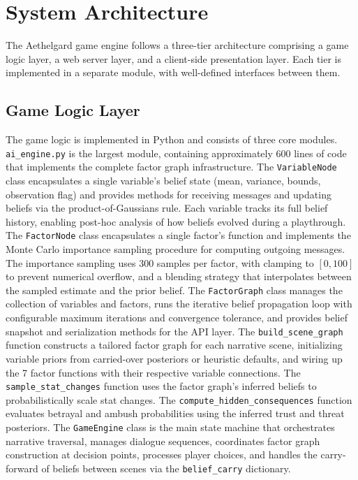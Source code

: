 \documentclass[journal]{IEEEtran}
\begin{document}
\section{System Architecture}

The Aethelgard game engine follows a three-tier architecture comprising a game logic layer, a web server layer, and a client-side presentation layer. Each tier is implemented in a separate module, with well-defined interfaces between them.

\subsection{Game Logic Layer}

The game logic is implemented in Python and consists of three core modules. \texttt{ai\_engine.py} is the largest module, containing approximately 600 lines of code that implements the complete factor graph infrastructure. The \texttt{VariableNode} class encapsulates a single variable's belief state (mean, variance, bounds, observation flag) and provides methods for receiving messages and updating beliefs via the product-of-Gaussians rule. Each variable tracks its full belief history, enabling post-hoc analysis of how beliefs evolved during a playthrough. The \texttt{FactorNode} class encapsulates a single factor's function and implements the Monte Carlo importance sampling procedure for computing outgoing messages. The importance sampling uses 300 samples per factor, with clamping to $[0, 100]$ to prevent numerical overflow, and a blending strategy that interpolates between the sampled estimate and the prior belief. The \texttt{FactorGraph} class manages the collection of variables and factors, runs the iterative belief propagation loop with configurable maximum iterations and convergence tolerance, and provides belief snapshot and serialization methods for the API layer. The \texttt{build\_scene\_graph} function constructs a tailored factor graph for each narrative scene, initializing variable priors from carried-over posteriors or heuristic defaults, and wiring up the 7 factor functions with their respective variable connections. The \texttt{sample\_stat\_changes} function uses the factor graph's inferred beliefs to probabilistically scale stat changes. The \texttt{compute\_hidden\_consequences} function evaluates betrayal and ambush probabilities using the inferred trust and threat posteriors. The \texttt{GameEngine} class is the main state machine that orchestrates narrative traversal, manages dialogue sequences, coordinates factor graph construction at decision points, processes player choices, and handles the carry-forward of beliefs between scenes via the \texttt{belief\_carry} dictionary.
\end{document}
